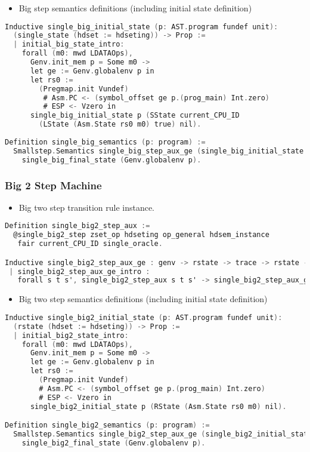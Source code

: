 \begin{itemize}[leftmargin=*]
\item Big step semantics definitions (including initial state definition)
\end{itemize}
\begin{lstlisting}[language=C]
Inductive single_big_initial_state (p: AST.program fundef unit): 
  (single_state (hdset := hdseting)) -> Prop :=
  | initial_big_state_intro: 
    forall (m0: mwd LDATAOps),
      Genv.init_mem p = Some m0 ->
      let ge := Genv.globalenv p in
      let rs0 :=
        (Pregmap.init Vundef)
         # Asm.PC <- (symbol_offset ge p.(prog_main) Int.zero)
         # ESP <- Vzero in
      single_big_initial_state p (SState current_CPU_ID 
        (LState (Asm.State rs0 m0) true) nil).
      
Definition single_big_semantics (p: program) :=
  Smallstep.Semantics single_big_step_aux_ge (single_big_initial_state p) 
    single_big_final_state (Genv.globalenv p).
\end{lstlisting}

\subsubsection{Big 2 Step Machine}
\begin{itemize}[leftmargin=*]
\item Big two step transition rule instance.
\end{itemize}
\begin{lstlisting}[language=C]
Definition single_big2_step_aux :=
  @single_big2_step zset_op hdseting op_general hdsem_instance 
   fair current_CPU_ID single_oracle.

Inductive single_big2_step_aux_ge : genv -> rstate -> trace -> rstate -> Prop :=
 | single_big2_step_aux_ge_intro : 
   forall s t s', single_big2_step_aux s t s' -> single_big2_step_aux_ge ge s t s'.
\end{lstlisting}


\begin{itemize}[leftmargin=*]
\item Big two step semantics definitions (including initial state definition)
\end{itemize}
\begin{lstlisting}[language=C]
Inductive single_big2_initial_state (p: AST.program fundef unit): 
  (rstate (hdset := hdseting)) -> Prop :=
  | initial_big2_state_intro: 
    forall (m0: mwd LDATAOps),
      Genv.init_mem p = Some m0 ->
      let ge := Genv.globalenv p in
      let rs0 :=
        (Pregmap.init Vundef)
        # Asm.PC <- (symbol_offset ge p.(prog_main) Int.zero)
        # ESP <- Vzero in
      single_big2_initial_state p (RState (Asm.State rs0 m0) nil).

Definition single_big2_semantics (p: program) :=
  Smallstep.Semantics single_big2_step_aux_ge (single_big2_initial_state p) 
    single_big2_final_state (Genv.globalenv p).
\end{lstlisting}

